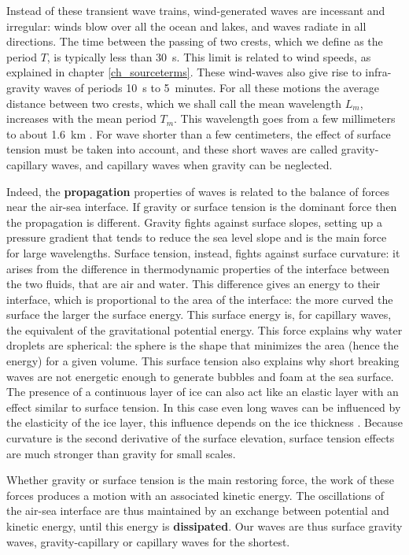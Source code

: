 Instead of these transient wave trains, wind-generated waves are incessant and irregular: winds blow over all the ocean and lakes, and waves radiate in all directions. 
The  time between the passing of two crests, which we define as the period $T$,  is typically less than 30~s. This limit is related 
to wind speeds, as explained in chapter \ref{ch_sourceterms}. 
These wind-waves also give rise to infra-gravity waves of periods 10~s to 5~minutes. For all these motions 
the average distance between two crests, which we shall call the mean wavelength $L_m$, increases with the mean period $T_m$. 
This wavelength goes from a few millimeters to about 1.6~km \citep{Ardhuin&al.2025}. For wave shorter than a few centimeters, the effect of surface 
tension must be taken into account, and these short waves are called gravity-capillary waves, and capillary waves when gravity can be neglected. 

Indeed, the \textbf{propagation} properties of waves is related to the balance of forces near the air-sea interface. If gravity or surface tension is the dominant force then the propagation is different.
Gravity fights against surface slopes, setting up a pressure gradient that tends to reduce the sea level slope and is the main force 
for large wavelengths. Surface tension, instead, fights against surface curvature:
it arises from the difference in thermodynamic properties of the interface between the two fluids, that are air and water. 
This difference gives an energy to their interface, which is proportional to the area of the interface: the more curved the surface the 
larger the surface energy. This surface energy is, for capillary waves, the equivalent of the gravitational potential energy. This force explains 
why water droplets are spherical: the sphere is the shape that minimizes the area (hence the energy) for a given volume. 
This surface tension also explains why short breaking waves are not energetic enough to generate bubbles and foam at the sea surface. 
The presence of a continuous layer of ice can also act like an elastic layer with an effect similar to surface tension. In this case
even long waves can be influenced by the elasticity of the ice layer, this influence depends on the ice thickness \citep[e.g.][]{Squire&al.1995}. 
Because curvature is the second derivative of the surface elevation, surface tension effects are much stronger than gravity for small scales. 

Whether gravity or surface tension is the main restoring force, the work of these forces produces a motion with an associated kinetic energy. 
The oscillations of the air-sea interface are thus maintained by an exchange between potential and kinetic energy, 
until this energy is \textbf{dissipated}. Our waves are thus surface gravity waves, gravity-capillary or capillary waves for the shortest. 

